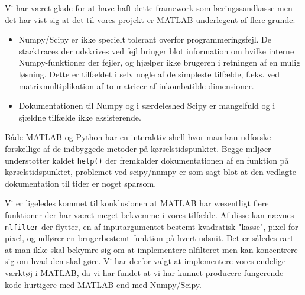 Vi har været glade for at have haft dette framework som 
læringssandkasse men det har vist sig at det til vores projekt er MATLAB underlegent af flere grunde:
\begin{itemize}
	\item Numpy/Scipy er ikke specielt tolerant overfor programmeringsfejl. De stacktraces der udskrives ved fejl bringer blot information om hvilke interne Numpy-funktioner der fejler, og hjælper ikke brugeren i retningen af en mulig løsning. Dette er tilfældet i selv nogle af de simpleste tilfælde, f.eks. ved matrixmultiplikation af to matricer af inkombatible dimensioner. %
	\item Dokumentationen til Numpy og i særdeleshed Scipy er mangelfuld og i sjældne tilfælde ikke eksisterende. 
\end{itemize}

Både MATLAB og Python har en interaktiv shell hvor man kan udforske forskellige af de indbyggede metoder på kørselstidspunktet. Begge miljøer understøtter kaldet \texttt{help()} der fremkalder dokumentationen af en funktion på kørselstidspunktet, problemet ved scipy/numpy er som sagt blot at den vedlagte dokumentation til tider er noget sparsom.

Vi er ligeledes kommet til konklusionen at MATLAB har væsentligt flere funktioner der har været meget bekvemme i vores tilfælde. Af disse kan nævnes \texttt{nlfilter} der flytter, en af inputargumentet bestemt kvadratisk "kasse", pixel for pixel, og udfører en brugerbestemt funktion på hvert udsnit. Det er således rart at man ikke skal bekymre sig om at implementere nlfilteret men kan koncentrere sig om hvad den skal gøre. 
Vi har derfor valgt at implementere vores endelige værktøj i MATLAB, da vi har fundet at vi har kunnet producere fungerende kode hurtigere med MATLAB end med Numpy/Scipy. %
